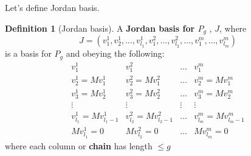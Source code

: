 \documentclass[twoside]{amsart}
\theoremstyle{plain}
\theoremstyle{definition}
\newtheorem{definition}{Definition}
\begin{document}
Let's define Jordan basis.  
\begin{definition}[Jordan basis]
A \textbf{ Jordan basis for $P_g$ }, $J$, where 
\begin{equation}
  J = ( v_1^1, v_2^1, \dots , v_{l_1}^1 , v_1^2, \dots , v_{l_2}^2, \dots , v_1^m , \dots , v_{l_m}^m )
\end{equation}
 is a basis for $P_g$ and obeying the following:
 \begin{equation}\label{E:Jordan_basis_definition}
   \begin{matrix}
     v_1^1 & v_1^2 & \dots & v_1^m \\
     v_2^1 = Mv_1^1 & v_2^2 = M v_1^2 & \dots & v_2^m = M v_1^m \\
     v_3^1 = Mv_2^1 & v_3^2 = M v_2^2 & \dots & v_3^m = M v_2^m \\
     \vdots & \vdots & \vdots & \vdots \\
     v_{l_1}^1 = Mv_{l_1-1}^1 & v_{l_2}^2 = M v_{l_2-1}^2 & \dots & v_{l_m}^m = M v_{l_m-1}^m \\
     Mv_{l_1}^1 = 0 & Mv_{l_2}^2 = 0 & \dots & M v_{l_m}^m =0 
     \end{matrix}
 \end{equation}
 where each column or \textbf{ chain } has length $\leq g$
\end{definition}
\end{document}

